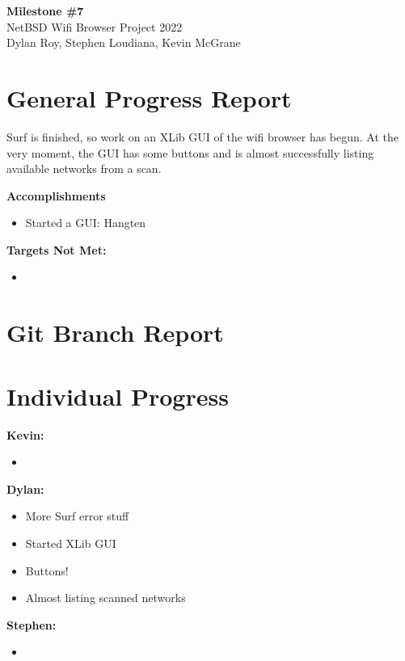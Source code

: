 \documentclass[11pt]{article}
\begin{document}
\begin{center}
  \textbf{\Large Milestone \#7}\\\large NetBSD Wifi Browser Project 2022\\
  Dylan Roy, Stephen Loudiana, Kevin McGrane
\end{center}

\section{General Progress Report}
Surf is finished, so work on an XLib GUI of the wifi browser has begun.
At the very moment, the GUI has some buttons and is almost successfully
listing available networks from a scan.

\textbf{Accomplishments}
\begin{itemize}
  \item Started a GUI: Hangten
\end{itemize}

\textbf{Targets Not Met:}
\begin{itemize}
  \item 
\end{itemize}


\section{Git Branch Report}

\newpage
\section{Individual Progress}

\textbf{Kevin:}
\begin{itemize}
  \item 
\end{itemize}

\textbf{Dylan:}
\begin{itemize}
  \item More Surf error stuff
  \item Started XLib GUI
  \item Buttons!
  \item Almost listing scanned networks
\end{itemize}

\textbf{Stephen:}
\begin{itemize}
  \item 
\end{itemize}
\end{document}
